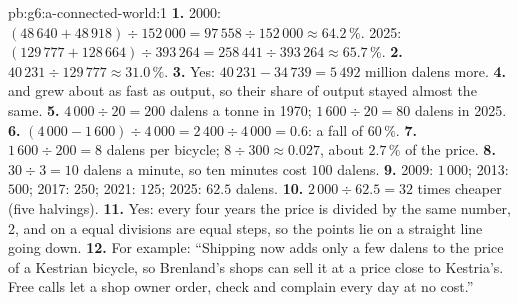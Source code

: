 \begin{solution}{pb:g6:a-connected-world:1}
\textbf{1.} 2000: $(48\,640 + 48\,918) \div 152\,000 = 97\,558 \div 152\,000 \approx
64.2\,\%$. 2025: $(129\,777 + 128\,664) \div 393\,264 = 258\,441 \div 393\,264 \approx
65.7\,\%$.
\textbf{2.} $40\,231 \div 129\,777 \approx 31.0\,\%$.
\textbf{3.} Yes: $40\,231 - 34\,739 = 5\,492$ million dalens more.
\textbf{4.}  and  grew about as fast as output, so their share of output
stayed almost the same.
\textbf{5.} $4\,000 \div 20 = 200$ dalens a tonne in 1970; $1\,600 \div 20 = 80$ dalens
in 2025.
\textbf{6.} $(4\,000 - 1\,600) \div 4\,000 = 2\,400 \div 4\,000 = 0.6$: a fall of
$60\,\%$.
\textbf{7.} $1\,600 \div 200 = 8$ dalens per bicycle; $8 \div 300 \approx 0.027$, about
$2.7\,\%$ of the price.
\textbf{8.} $30 \div 3 = 10$ dalens a minute, so ten minutes cost $100$ dalens.
\textbf{9.} 2009: $1\,000$; 2013: $500$; 2017: $250$; 2021: $125$; 2025: $62.5$
dalens.
\textbf{10.} $2\,000 \div 62.5 = 32$ times cheaper (five halvings).
\textbf{11.} Yes: every four years the price is divided by the same number, 2, and on a
 equal divisions are equal steps, so the points lie on a straight line
going down.
\textbf{12.} For example: ``Shipping now adds only a few dalens to the price of a
Kestrian bicycle, so Brenland's shops can sell it at a price close to Kestria's. Free
calls let a shop owner order, check and complain every day at no cost.''
\end{solution}
